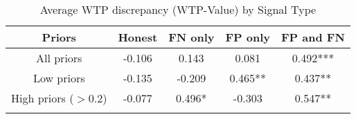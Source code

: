 \begin{table}[H]\centering \caption{Average WTP discrepancy (WTP-Value) by Signal Type} \begin{tabular}{ccccc} \hline \hline
\textbf{Priors}&\textbf{Honest}&\textbf{FN only}& \textbf{FP only} & \textbf{FP and FN}\\ \hline
All priors&-0.106&0.143&0.081&0.492***\\
Low priors&-0.135&-0.209&0.465**&0.437**\\
High priors ($>$0.2)&-0.077&0.496*&-0.303&0.547**\\
\hline \\ \end{tabular} \end{table}
